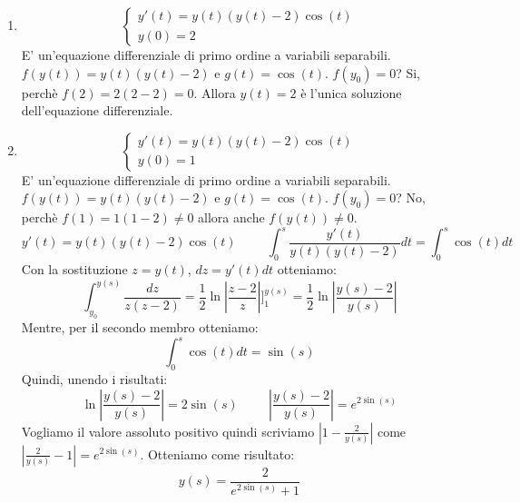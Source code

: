 \begin{exercise}
\begin{enumerate}
    \item \begin{equation*}\begin{cases}y'(t)=y(t)(y(t)-2)\cos(t)\\y(0)=2\end{cases}\end{equation*}
    E' un'equazione differenziale di primo ordine a variabili separabili. $f(y(t))=y(t)(y(t)-2)$ e $g(t)=\cos(t)$. $f(y_0)=0$? Si, perchè $f(2)=2(2-2)=0$. Allora $y(t)=2$ è l'unica soluzione dell'equazione differenziale.
    
    \item \begin{equation*}\begin{cases}y'(t)=y(t)(y(t)-2)\cos(t)\\y(0)=1\end{cases}\end{equation*}
    E' un'equazione differenziale di primo ordine a variabili separabili. $f(y(t))=y(t)(y(t)-2)$ e $g(t)=\cos(t)$. $f(y_0)=0$? No, perchè $f(1)=1(1-2)\neq0$ allora anche $f(y(t))\neq0$.
    \begin{equation*}y'(t)=y(t)(y(t)-2)\cos(t)\hspace{1cm}\int^s_0\frac{y'(t)}{y(t)(y(t)-2)}dt=\int^s_0\cos(t)dt\end{equation*}
    Con la sostituzione $z=y(t)$, $dz=y'(t)dt$ otteniamo:
    \begin{equation*}\int^{y(s)}_{y_0}\frac{dz}{z(z-2)}=\frac{1}{2}\ln|\frac{z-2}{z}|]^{y(s)}_{1}=\frac{1}{2}\ln|\frac{y(s)-2}{y(s)}|\end{equation*}
    Mentre, per il secondo membro otteniamo:
    \begin{equation*}\int^s_0\cos(t)dt=\sin(s)\end{equation*}
    Quindi, unendo i risultati:
    \begin{equation*}\ln|\frac{y(s)-2}{y(s)}|=2\sin(s)\hspace{1cm}|\frac{y(s)-2}{y(s)}|=e^{2\sin(s)}\end{equation*}
    Vogliamo il valore assoluto positivo quindi scriviamo $|1-\frac{2}{y(s)}|$ come $|\frac{2}{y(s)}-1|=e^{2\sin(s)}$.
    Otteniamo come risultato:
    \begin{equation*}y(s)=\frac{2}{e^{2\sin(s)}+1}\end{equation*}
    

\end{enumerate}
\end{exercise}

